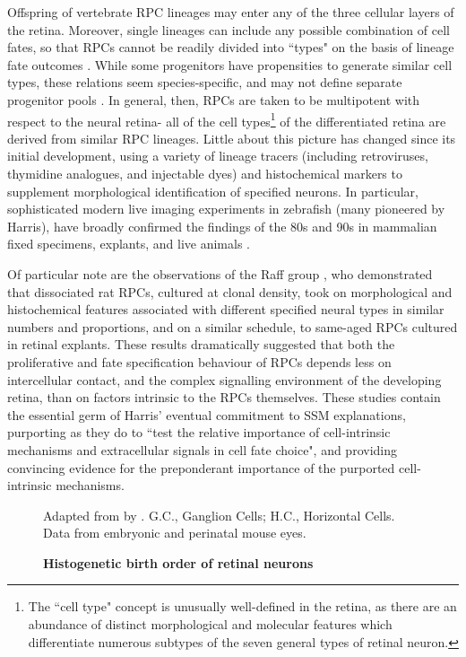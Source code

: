 Offspring of vertebrate RPC lineages may enter any of the three cellular layers of the retina. Moreover, single lineages can include any possible combination of cell fates, so that RPCs cannot be readily divided into ``types" on the basis of lineage fate outcomes \cite{Holt1988,Turner1990,Wetts1988}. While some progenitors have propensities to generate similar cell types, these relations seem species-specific, and may not define separate progenitor pools \cite{Adler2008}. In general, then, RPCs are taken to be multipotent with respect to the neural retina- all of the cell types\footnote{The ``cell type" concept is unusually well-defined in the retina, as there are an abundance of distinct morphological and molecular features which differentiate numerous subtypes of the seven general types of retinal neuron.} of the differentiated retina are derived from similar RPC lineages. Little about this picture has changed since its initial development, using a variety of lineage tracers (including retroviruses, thymidine analogues, and injectable dyes) and histochemical markers to supplement morphological identification of specified neurons. In particular, sophisticated modern live imaging experiments in zebrafish (many pioneered by Harris), have broadly confirmed the findings of the 80s and 90s in mammalian fixed specimens, explants, and live animals \cite{Boije2015}.

\label{Raff}
Of particular note are the observations of the Raff group \cite{Watanabe1990,Cayouette2003}, who demonstrated that dissociated rat RPCs, cultured at clonal density, took on morphological and histochemical features associated with different specified neural types in similar numbers and proportions, and on a similar schedule, to same-aged RPCs cultured in retinal explants. These results dramatically suggested that both the proliferative and fate specification behaviour of RPCs depends less on intercellular contact, and the complex signalling environment of the developing retina, than on factors intrinsic to the RPCs themselves. These studies contain the essential germ of Harris' eventual commitment to SSM explanations, purporting as they do to ``test the relative importance of cell-intrinsic mechanisms and extracellular signals in cell fate choice", and providing convincing evidence for the preponderant importance of the purported cell-intrinsic mechanisms.

\begin{figure}[!h]
  \caption{{\bf Histogenetic birth order of retinal neurons}}
  Adapted from \cite{Young1985} by \cite{Cepko1996}. G.C., Ganglion Cells; H.C., Horizontal Cells. Data from embryonic and perinatal mouse eyes.
  \label{horder}
\end{figure}

